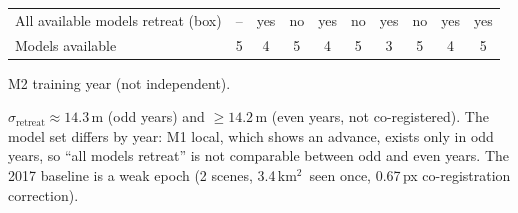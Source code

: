 \documentclass[10pt]{article}
\newcommand{\kmsq}{km$^2$}
\newcommand{\tr}{$^\dagger$}   %
\begin{document}
\begin{table}
\begin{threeparttable}
\begin{tabular}{l ccccccccc}
\midrule
All available models retreat (box) & -- & yes & no & yes & no & yes & no & yes & yes \\
Models available                   & 5 & 4 & 5 & 4 & 5 & 3 & 5 & 4 & 5 \\
\bottomrule
\end{tabular}
\begin{tablenotes}\footnotesize
\item[\tr] M2 training year (not independent).
\item $\sigma_\mathrm{retreat} \approx 14.3$\,m (odd years) and $\geq 14.2$\,m (even years, not
co-registered). The model set differs by year: M1 local, which shows an advance, exists only in odd
years, so ``all models retreat'' is not comparable between odd and even years. The 2017 baseline is a
weak epoch (2 scenes, 3.4\,\kmsq\ seen once, 0.67\,px co-registration correction).
\end{tablenotes}
\end{threeparttable}
\end{table}
\end{document}
